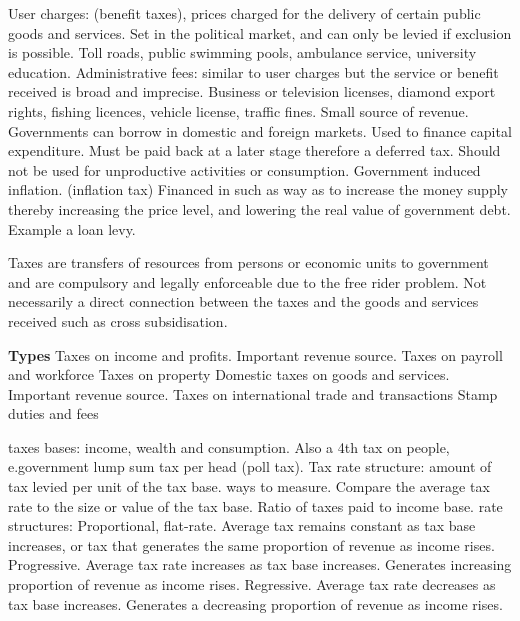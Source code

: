 \documentclass[12pt]{examnotes}
\begin{document}
\ra User charges: (benefit taxes), prices charged for the delivery of certain public goods and services. Set in the political market, and can only be levied if exclusion is possible. Toll roads, public swimming pools, ambulance service, university education.
\ra Administrative fees: similar to user charges but the service or benefit received is broad and imprecise. Business or television licenses, diamond export rights, fishing licences, vehicle license, traffic fines. Small source of revenue.
\ra Governments can borrow in domestic and foreign markets. Used to finance capital expenditure. Must be paid back at a later stage therefore a deferred tax. Should not be used for unproductive activities or consumption.
\ra Government induced inflation. (inflation tax) Financed in such as way as to increase the money supply thereby increasing the price level, and lowering the real value of government debt. Example a loan levy.

\ra Taxes are transfers of resources from persons or economic units to government and are compulsory and legally enforceable due to the free rider problem. 
\ra Not necessarily a direct connection between the taxes and the goods and services received such as cross subsidisation.

{\bf Types}
 Taxes on income and profits. Important revenue source.
 Taxes on payroll and workforce 
 Taxes on property
 Domestic taxes on goods and services. Important revenue source.
 Taxes on international trade and transactions
 Stamp duties and fees

 taxes bases: income, wealth and consumption.
\ra Also a 4th tax on people, e.government lump sum tax per head (poll tax).
\ra Tax rate structure: amount of tax levied per unit of the tax base. 
 ways to measure. 
 Compare the average tax rate to the size or value of the tax base. 
 Ratio of taxes paid to income base.
 rate structures: 
 Proportional, flat-rate. Average tax remains constant as tax base increases, or tax that generates the same proportion of revenue as income rises.
 Progressive. Average tax rate increases as tax base increases. Generates increasing proportion of revenue as income rises.
 Regressive. Average tax rate decreases as tax base increases. Generates a decreasing proportion of revenue as income rises.
\end{document}
